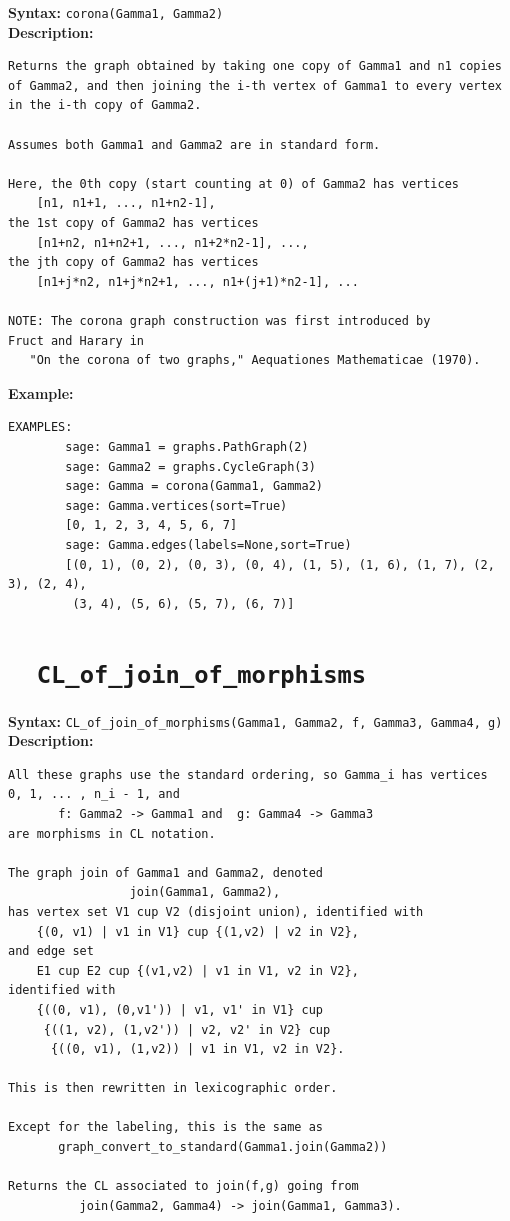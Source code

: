 \documentclass{article}
\begin{document}
\textbf{Syntax:} \verb}corona(Gamma1, Gamma2)}\\

\textbf{Description:}
\begin{verbatim}
Returns the graph obtained by taking one copy of Gamma1 and n1 copies
of Gamma2, and then joining the i-th vertex of Gamma1 to every vertex
in the i-th copy of Gamma2.

Assumes both Gamma1 and Gamma2 are in standard form.
  
Here, the 0th copy (start counting at 0) of Gamma2 has vertices
    [n1, n1+1, ..., n1+n2-1],
the 1st copy of Gamma2 has vertices
    [n1+n2, n1+n2+1, ..., n1+2*n2-1], ...,
the jth copy of Gamma2 has vertices
    [n1+j*n2, n1+j*n2+1, ..., n1+(j+1)*n2-1], ...
 
NOTE: The corona graph construction was first introduced by
Fruct and Harary in
   "On the corona of two graphs," Aequationes Mathematicae (1970).
\end{verbatim}

\textbf{Example:}
\begin{verbatim}
EXAMPLES:
        sage: Gamma1 = graphs.PathGraph(2)       
        sage: Gamma2 = graphs.CycleGraph(3)       
        sage: Gamma = corona(Gamma1, Gamma2)      
        sage: Gamma.vertices(sort=True)                    
        [0, 1, 2, 3, 4, 5, 6, 7]
        sage: Gamma.edges(labels=None,sort=True)           
        [(0, 1), (0, 2), (0, 3), (0, 4), (1, 5), (1, 6), (1, 7), (2, 3), (2, 4),
         (3, 4), (5, 6), (5, 7), (6, 7)]
\end{verbatim}

\section{\tt \ \ CL\_of\_join\_of\_morphisms}

\textbf{Syntax:} \verb}CL_of_join_of_morphisms(Gamma1, Gamma2, f, Gamma3, Gamma4, g)}\\

\textbf{Description:}
\begin{verbatim}
All these graphs use the standard ordering, so Gamma_i has vertices
0, 1, ... , n_i - 1, and
       f: Gamma2 -> Gamma1 and  g: Gamma4 -> Gamma3
are morphisms in CL notation.

The graph join of Gamma1 and Gamma2, denoted
                 join(Gamma1, Gamma2),
has vertex set V1 cup V2 (disjoint union), identified with
    {(0, v1) | v1 in V1} cup {(1,v2) | v2 in V2},
and edge set
    E1 cup E2 cup {(v1,v2) | v1 in V1, v2 in V2},
identified with
    {((0, v1), (0,v1')) | v1, v1' in V1} cup
     {((1, v2), (1,v2')) | v2, v2' in V2} cup
      {((0, v1), (1,v2)) | v1 in V1, v2 in V2}.

This is then rewritten in lexicographic order.

Except for the labeling, this is the same as 
       graph_convert_to_standard(Gamma1.join(Gamma2))

Returns the CL associated to join(f,g) going from
          join(Gamma2, Gamma4) -> join(Gamma1, Gamma3).
\end{verbatim}
\end{document}
